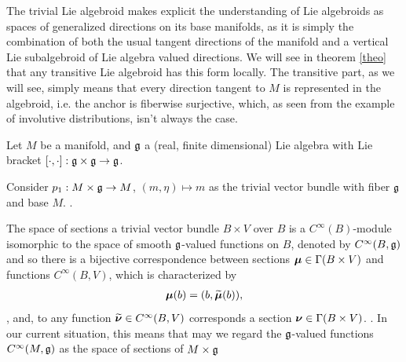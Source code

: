 The trivial Lie algebroid makes explicit the understanding of Lie algebroids as spaces of generalized directions on its base manifolds, as it is simply the combination of both the usual tangent directions of the manifold and a vertical Lie subalgebroid of Lie algebra valued directions. We will see in theorem \ref{theo} that any transitive Lie algebroid has this form locally. The transitive part, as we will see, simply means that every direction tangent to $M$ is represented in the algebroid, i.e. the anchor is fiberwise surjective, which, as seen from the example of involutive distributions, isn't always the case.

Let $M$ be a manifold, and $\mathfrak{g}$ a (real, finite dimensional) Lie algebra with Lie bracket $[\cdot , \cdot]: \mathfrak{g} \times \mathfrak{g} \to \mathfrak{g}$.

Consider $p_1: M \times \mathfrak{g} \to M$, $(m, \eta) \mapsto m$ as the trivial vector bundle with fiber $\mathfrak{g}$ and base $M$. . %

The space of sections a trivial vector bundle $B \times V$ over $B$ is a $C^\infty(B)$-module isomorphic to the space of smooth $\mathfrak{g}$-valued functions on $B$, denoted by \emph{$C^\infty(B, \mathfrak{g})$} and so 
there is a bijective correspondence between sections $\bm{\mu} \in \Gamma(B \times V)$ and functions $C^\infty(B, V)$, which is characterized by
\begin{align} \label{defnTildeSect}
    \bm{\mu}(b) = (b, \widetilde{\bm{\mu}}(b)),
\end{align}, and, to any function $\widetilde{\bm{\nu}} \in C^\infty(B, V)$ corresponds a section $\bm{\nu} \in \Gamma(B \times V)$. . In our current situation, this means that may we regard the $\mathfrak{g}$-valued functions $C^\infty(M, \mathfrak{g})$ as the space of sections of $M \times \mathfrak{g}$

